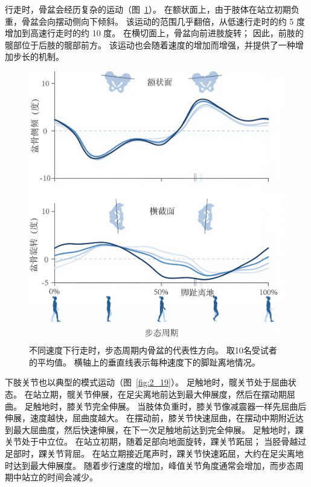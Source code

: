 行走时，骨盆会经历复杂的运动（图~\ref{fig:2_18}）。
在额状面上，由于肢体在站立初期负重，骨盆会向摆动侧向下倾斜。
该运动的范围几乎翻倍，从低速行走时的约 5 度增加到高速行走时的约 10 度。
在横切面上，骨盆向前进肢旋转；
因此，前肢的髋部位于后肢的髋部前方。
该运动也会随着速度的增加而增强，并提供了一种增加步长的机制。


\begin{figure}[!htb]
	\centering
	\includegraphics[width=0.8\linewidth]{chap2/2_18}
	\caption{不同速度下行走时，步态周期内骨盆的代表性方向。
		取10名受试者的平均值。
		横轴上的垂直线表示每种速度下的脚趾离地情况\cite{arnold2013muscle}。 \label{fig:2_18}}
\end{figure}


下肢关节也以典型的模式运动（图~\ref{fig:2_19}）。
足触地时，髋关节处于屈曲状态。
在站立期，髋关节伸展，在足尖离地前达到最大伸展度，然后在摆动期屈曲。
足触地时，膝关节完全伸展。
当肢体负重时，膝关节像减震器一样先屈曲后伸展，速度越快，屈曲度越大。
在摆动前，膝关节快速屈曲，在摆动中期附近达到最大屈曲度，然后快速伸展，在下一次足触地前达到完全伸展。
足触地时，踝关节处于中立位。
在站立初期，随着足部向地面旋转，踝关节跖屈；
当胫骨越过足部时，踝关节背屈。
在站立期接近尾声时，踝关节快速跖屈，大约在足尖离地时达到最大伸展度。
随着步行速度的增加，峰值关节角度通常会增加，而步态周期中站立的时间会减少。


